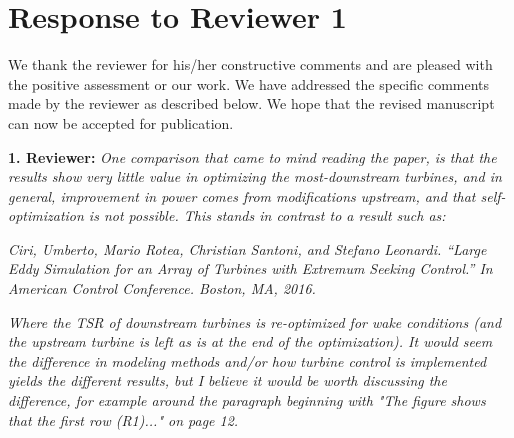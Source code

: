 \documentclass[]{article}
\begin{document}


\section*{Response to Reviewer 1}

We thank the reviewer for his/her constructive comments and are pleased with the positive assessment or our work. We have addressed the specific comments made by the reviewer as described below. We hope that the revised manuscript can now be accepted for publication.

\dotfill

\textbf{1. Reviewer:} \textit{One comparison that came to mind reading the paper, is that the results show very little value in optimizing the most-downstream turbines, and in general, improvement in power comes from modifications upstream, and that self-optimization is not possible. This stands in contrast to a result such as:}
	
\textit{Ciri, Umberto, Mario Rotea, Christian Santoni, and Stefano Leonardi. “Large Eddy Simulation for an Array of Turbines with Extremum Seeking Control.” In American Control Conference. Boston, MA, 2016. }
	
\textit{Where the TSR of downstream turbines is re-optimized for wake conditions (and the upstream turbine is left as is at the end of the optimization). It would seem the difference in modeling methods and/or how turbine control is implemented yields the different results, but I believe it would be worth discussing the difference, for example around the paragraph beginning with "The figure shows that the first row (R1)..." on page 12.}
\end{document}
